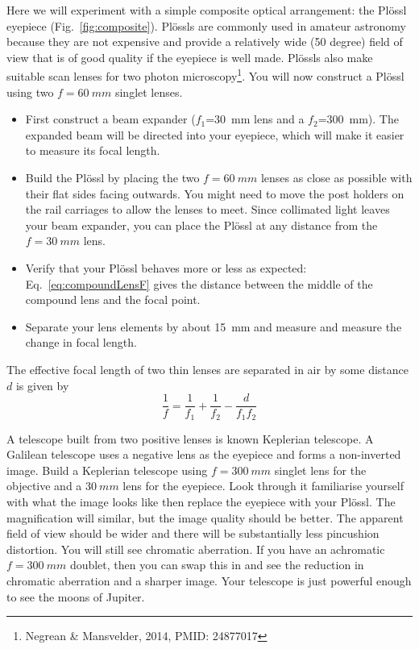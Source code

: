 \documentclass[a4paper]{report}
\begin{document}
Here we will experiment with a simple composite optical arrangement: the Pl\"{o}ssl eyepiece (Fig.~\ref{fig:composite}). 
Pl\"{o}ssls are commonly used in amateur astronomy because they are not expensive and provide a relatively wide (50 degree) field of view that is of good 
quality if the eyepiece is well made. 
Pl\"{o}ssls also make suitable scan lenses for two photon microscopy\footnote{Negrean \& Mansvelder, 2014, PMID: 24877017}.
You will now construct a Pl\"{o}ssl using two $f=60~mm$ singlet lenses.


\begin{itemize}
\item First construct a beam expander ($f_1$=30~mm lens and a $f_2$=300~mm). 
The expanded beam will be directed into your eyepiece, which will make it easier to measure its focal length.
\item Build the Pl\"ossl by placing the two $f=60~mm$ lenses as close as possible with their flat sides facing outwards. 
You might need to move the post holders on the rail carriages to allow the lenses to meet.
Since collimated light leaves your beam expander, you can place the Pl\"ossl at any distance from the $f=30~mm$ lens. 
\item Verify that your Pl\"{o}ssl behaves more or less as expected: 
Eq.~\ref{eq:compoundLensF} gives the distance between the middle of the compound lens and the focal point. 
\item Separate your lens elements by about 15~mm and measure and measure the change in focal length.
\end{itemize}

The effective focal length of two thin lenses are separated in air by some distance $d$ is given by
\begin{equation}
\frac{1}{f} = \frac{1}{f_1} + \frac{1}{f_2} - \frac{d}{f_1f_2}
\label{eq:compoundLensF}
\end{equation}

A telescope built from two positive lenses is known Keplerian telescope. 
A Galilean telescope uses a negative lens as the eyepiece and forms a non-inverted image.
Build a Keplerian telescope using $f=300~mm$ singlet lens for the objective and a $30~mm$ lens for the eyepiece. 
Look through it familiarise yourself with what the image looks like then replace the eyepiece with your Pl\"{o}ssl. 
The magnification will similar, but the image quality should be better. 
The apparent field of view should be wider and there will be substantially less pincushion distortion. 
You will still see chromatic aberration. 
If you have an achromatic $f=300~mm$ doublet, then you can swap this in and see the reduction in chromatic aberration and a sharper image. 
Your telescope is just powerful enough to see the moons of Jupiter. 
\end{document}
